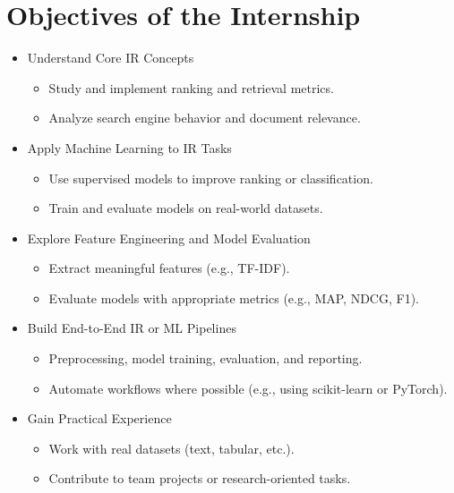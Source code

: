 \documentclass[12pt,a4paper]{report}
\begin{document}
\newpage
\section{Objectives of the Internship}

\begin{itemize}
  \item Understand Core IR Concepts
\begin{itemize}


  \item Study and implement ranking and retrieval metrics.

\item Analyze search engine behavior and document relevance.
\end{itemize}


\item Apply Machine Learning to IR Tasks
\begin{itemize}

\item Use supervised models to improve ranking or classification.

\item Train and evaluate models on real-world datasets.
\end{itemize}


\item Explore Feature Engineering and Model Evaluation
\begin{itemize}

\item Extract meaningful features (e.g., TF-IDF).

\item Evaluate models with appropriate metrics (e.g., MAP, NDCG, F1).
\end{itemize}


\item Build End-to-End IR or ML Pipelines
\begin{itemize}

\item Preprocessing, model training, evaluation, and reporting.

\item Automate workflows where possible (e.g., using scikit-learn or PyTorch).
\end{itemize}


\item Gain Practical Experience
\begin{itemize}

\item Work with real datasets (text, tabular, etc.).

\item Contribute to team projects or research-oriented tasks.
\end{itemize}

\end{itemize}
\end{document}
